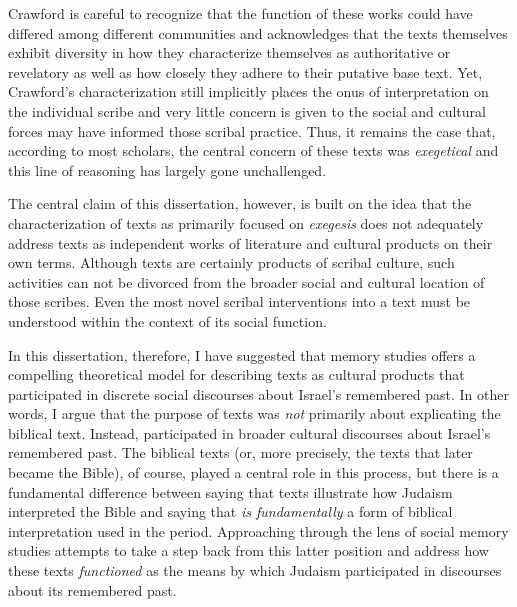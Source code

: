 \noindent
Crawford is careful to recognize that the function of these works could have differed among different communities and acknowledges that the texts themselves exhibit diversity in how they characterize themselves as authoritative or revelatory as well as how closely they adhere to their putative base text.%
    \autocite[13]{crawford2008}
Yet, Crawford's characterization still implicitly places the onus of interpretation on the individual scribe and very little concern is given to the social and cultural forces may have informed those scribal practice. Thus, it remains the case that, according to most scholars, the central concern of these texts was \emph{exegetical} and this line of reasoning has largely gone unchallenged. 

The central claim of this dissertation, however, is built on the idea that the characterization of \rwb texts as primarily focused on \emph{exegesis} does not adequately address \rwb texts as independent works of literature and cultural products on their own terms. Although \rwb texts are certainly products of scribal culture, such activities can not be divorced from the broader social and cultural location of those scribes. Even the most novel scribal interventions into a text must be understood within the context of its social function.

In this dissertation, therefore, I have suggested that memory studies offers a compelling theoretical model for describing \rwb texts as cultural products that participated in discrete social discourses about Israel's remembered past. In other words, I argue that the purpose of \rwb texts was \emph{not} primarily about explicating the biblical text. Instead, \rwb participated in broader cultural discourses about Israel's remembered past. The biblical texts (or, more precisely, the texts that later became the Bible), of course, played a central role in this process, but there is a fundamental difference between saying that \rwb texts illustrate how \secondtemple Judaism interpreted the Bible and saying that \rwb \emph{is fundamentally} a form of biblical interpretation used in the \secondtemple period. Approaching \rwb through the lens of social memory studies attempts to take a step back from this latter position and address how these texts \emph{functioned} as the means by which \secondtemple Judaism participated in discourses about its remembered past.

